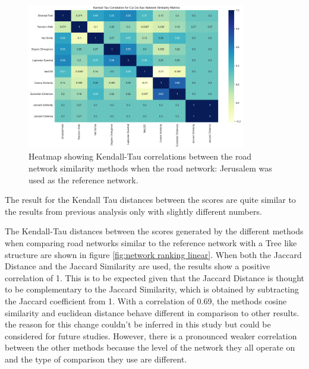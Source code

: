 \begin{figure}[!ht]
\centering
\includegraphics[width=0.85\textwidth,center]{picture/Cul De Sac/culdesac2.png}
\caption[Heatmap showing Kendall-Tau correlations between the road network similarity methods for Cul De Sac Road Networks]{Heatmap showing Kendall-Tau correlations between the road network similarity methods when the road network: Jerusalem was used as the reference network.}
\label{fig:network ranking Cul De Sac}
\end{figure}

The result for the Kendall Tau distances between the scores are quite similar to the results from previous analysis only with slightly different numbers. 

The Kendall-Tau distances between the scores generated by the different methods when comparing road networks similar to the reference network with a Tree like structure are shown in figure \ref{fig:network ranking linear}. When both the Jaccard Distance and the Jaccard Similarity are used, the results show a positive correlation of 1. This is to be expected given that the Jaccard Distance is thought to be complementary to the Jaccard Similarity, which is obtained by subtracting the Jaccard coefficient from 1. With a correlation of 0.69, the methods cosine similarity and euclidean distance behave different in comparison to other results. the reason for this change couldn't be inferred in this study but could be considered for future studies. However, there is a pronounced weaker correlation between the other methods because the level of the network they all operate on and the type of comparison they use are different.